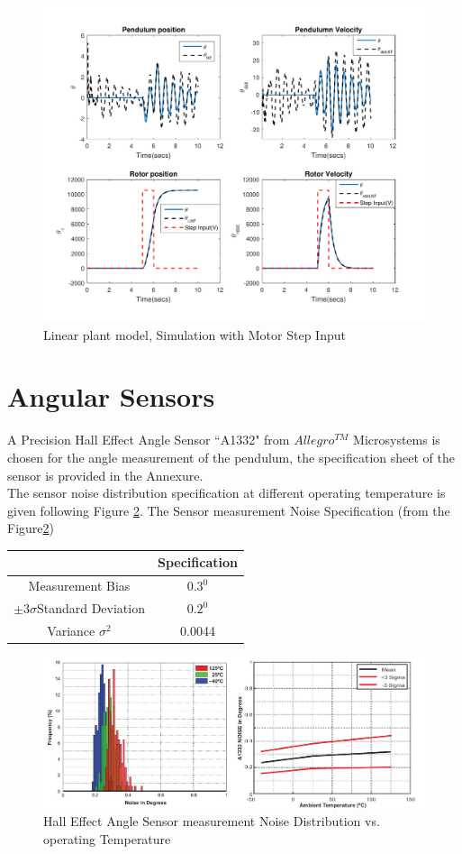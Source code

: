 \documentclass[a4paper]{article}
\begin{document}
\begin{figure}[h]
\centering
\includegraphics[width=0.7\linewidth]{fig/plot_1}
\caption{Linear plant model, Simulation with Motor Step Input}
\label{fig:plot_1}
\end{figure}
\newpage
\section{Angular Sensors}
A Precision Hall Effect Angle Sensor ``A1332" from $Allegro^{TM}$ Microsystems is chosen for the angle measurement of the pendulum, the specification sheet of the sensor is provided in the Annexure.\\
The sensor noise distribution specification at different operating temperature is given following Figure \ref{fig:Sensor_noise}.
The Sensor measurement Noise Specification (from the Figure\ref{fig:Sensor_noise})\\
\begin{center}
	\begin{tabular}{|c|c|}
		\hline  & Specification \\ 
		\hline Measurement Bias & $0.3^0$ \\ 
		\hline $\pm 3\sigma $Standard Deviation & $0.2^0$  \\ 
		\hline Variance $\sigma^2$ & 0.0044 \\ 
		\hline 
	\end{tabular} 
\end{center}

\begin{figure}[h!]
\centering
\includegraphics[width=0.625\linewidth]{fig/Sensor_noise}
\caption{Hall Effect Angle Sensor measurement Noise Distribution vs. operating Temperature}
\label{fig:Sensor_noise}
\end{figure}
\end{document}
